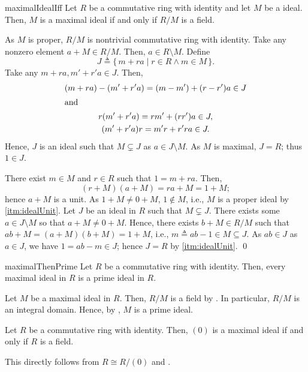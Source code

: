 \documentclass[../modern_algebra.tex]{subfiles}
\begin{document}
\begin{Theorem}{}{maximalIdealIff}
    Let \(R\) be a commutative ring with identity and let \(M\) be a ideal.
    Then, \(M\) is a maximal ideal if and only if \(R/M\) is a field.
\end{Theorem}
\begin{myclaim}[Proof]\hfill
\begin{itemize}[nolistsep, wide=0pt, widest={(\(\Rightarrow\))}, leftmargin=*, listparindent=\parindent]
    \ii[(\(\Rightarrow\))]
    As \(M\) is proper, \(R/M\) is nontrivial commutative ring with identity.
    Take any nonzero element \(a + M \in R/M\). Then, \(a \in R \setminus M\).
    Define
    \[
        J \triangleq \{\,m + ra \mid r \in R \land m \in M\,\}.
    \]
    Take any \(m + ra, m' + r'a \in J\). Then,
    \begin{gather*}
        (m + ra) - (m' + r'a) = (m - m') + (r - r')a \in J \\
        \shortintertext{and}
        r(m' + r'a) = rm' + (r r')a \in J, \\
        (m' + r'a)r = m'r + r'ra \in J.
    \end{gather*}
    Hence, \(J\) is an ideal such that \(M \subsetneq J\) as \(a \in J \setminus M\).
    As \(M\) is maximal, \(J = R\); thus \(1 \in J\).

    There exist \(m \in M\) and \(r \in R\) such that \(1 = m + ra\).
    Then,
    \[
        (r + M)(a + M) = ra + M = 1 + M;
    \]
    hence \(a + M\) is a unit.
    \ii[(\(\Leftarrow\))]
    As \(1 + M \neq 0 + M\), \(1 \notin M\), i.e., \(M\) is a proper ideal by \ref{itm:idealUnit}.
    Let \(J\) be an ideal in \(R\) such that \(M \subsetneq J\).
    There exists some \(a \in J \setminus M\) so that \(a + M \neq 0 + M\).
    Hence, there exists \(b + M \in R/M\) such that \(ab + M = (a + M)(b + M) = 1 + M\),
    i.e., \(m \triangleq ab - 1 \in M \subseteq J\). As \(ab \in J\) as \(a \in J\),
    we have \(1 = ab - m \in J\); hence \(J = R\) by \ref{itm:idealUnit}.
    \qed
\end{itemize}
\end{myclaim}

\begin{Corollary}{}{maximalThenPrime}
    Let \(R\) be a commutative ring with identity.
    Then, every maximal ideal in \(R\) is a prime ideal in \(R\).
\end{Corollary}
\begin{myproof}[Proof]
    Let \(M\) be a maximal ideal in \(R\).
    Then, \(R/M\) is a field by .
    In particular, \(R/M\) is an integral domain.
    Hence, by , \(M\) is a prime ideal.
\end{myproof}

\begin{Corollary}{\textsf{}}{}
    Let \(R\) be a commutative ring with identity.
    Then, \((0)\) is a maximal ideal if and only if \(R\) is a field.
\end{Corollary}
\begin{myproof}[Proof]
    This directly follows from \(R \cong R/(0)\) and .
\end{myproof}
\end{document}
